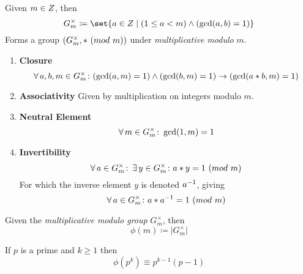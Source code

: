 \begin{definition}
    Given $m \in \relax{Z}$, then
    \begin{equation}
        G^{\times}_{m} \coloneqq \set{a \in \Int \mid (1 \le a < m) \land (\gcd(a, b) = 1)}
    \end{equation}
    Forms a group $\left( G^{\times}_{m}, \ast \ (\relax{mod}\ m) \right)$ under \textit{multiplicative modulo} $m$.
    
    \begin{enumerate}
        \item \textbf{Closure}
        \begin{equation}
            \operatorname{\forall} a, b, m \in G^{\times}_{m} \colon 
                (\gcd(a, m) = 1) \land (\gcd(b, m) = 1) \to (\gcd(a \ast b, m) = 1)
        \end{equation}
        \item \textbf{Associativity}
            \subitem Given by multiplication on integers modulo $m$.
        \item \textbf{Neutral Element}
        \begin{equation}
            \operatorname{\forall} m \in G^{\times}_{m} \colon \gcd(1, m) = 1
        \end{equation}
        \item \textbf{Invertibility}
        \begin{equation}
            \operatorname{\forall} a \in G^{\times}_{m} \colon \operatorname{\exists} y \in G^{\times}_{m} \colon a \ast y = 1 \ (\relax{mod}\ m)
        \end{equation}
        For which the inverse element $y$ is denoted ${a}^{-1}$, giving
        \begin{equation}
            \operatorname{\forall} a \in G^{\times}_{m} \colon a \ast {a}^{-1} = 1 \ (\relax{mod}\ m)
        \end{equation}
    \end{enumerate}
\end{definition}

\begin{theorem}
    Given the \textit{multiplicative modulo group} $G^{\times}_{m}$, then
    \begin{equation}
        \phi(m) \coloneqq \lvert G^{\times}_{m} \rvert
    \end{equation}
\end{theorem}

\begin{theorem}
    If $p$ is a prime and $k \ge 1$ then
    \begin{equation}
        \phi(p^k) \equiv p^{k - 1}(p - 1)
    \end{equation}
\end{theorem}


